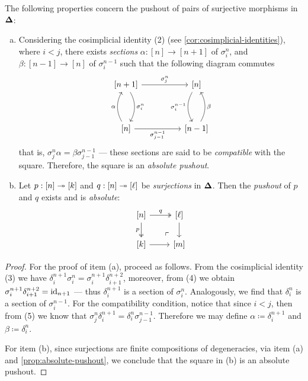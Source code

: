 \begin{lemma}
\label{lem:splx-cat-pushout-surjections}
The following properties concern the pushout of pairs of surjective morphisms in
\({\mathbf{\Delta}}\):
\begin{enumerate}[(a)]\setlength\itemsep{0em}
\item Considering the cosimplicial identity (2) (see
  \cref{cor:cosimplicial-identities}), where \(i < j\), there exists
  \emph{sections} \(\alpha: [n] \to [n+1]\) of \(\sigma_i^n\), and
  \(\beta: [n-1] \to [n]\) of \(\sigma_i^{n-1}\) such that the following diagram
  commutes
  \[
  \begin{tikzcd}
  {[n+1]} \ar[rr, "\sigma_j^n"] \ar[dd, bend left, "\sigma_i^n"]
  &&{[n]} \ar[dd, bend right, "\sigma_i^{n-1}"'] \\ & &\\
  {[n]} \ar[uu, bend left, "\alpha"] \ar[rr, "\sigma_{j-1}^{n-1}"']
  &&{[n-1]} \ar[uu, bend right, "\beta"']
  \end{tikzcd}
  \]
  that is, \(\sigma_j^n \alpha = \beta \sigma_{j-1}^{n-1}\) --- these sections
  are said to be \emph{compatible} with the square. Therefore, the square is an
  \emph{absolute pushout}.
\item Let \(p: [n] \twoheadrightarrow [k]\) and \(q: [n] \twoheadrightarrow [\ell]\) be \emph{surjections}
  in \({\mathbf{\Delta}}\). Then the \emph{pushout} of \(p\) and \(q\) exists and is
  \emph{absolute}:
  \[
  \begin{tikzcd}
  {[n]} \ar[r, two heads, "q"]
  \ar[d, two heads, "p"']
  \ar[rd, very near end, phantom, "\ulcorner"]
  &{[\ell]} \ar[d] \\
  {[k]} \ar[r] &{[m]}
  \end{tikzcd}
  \]
\end{enumerate}
\end{lemma}

\begin{proof}
For the proof of item (a), proceed as follows. From the cosimplicial identity
(3) we have \(\delta_i^{n+1} \sigma_i^n = \sigma_i^{n+1} \delta_{i+1}^{n+2}\),
moreover, from (4) we obtain \(\sigma_i^{n+1} \delta_{i+1}^{n+2} = \operatorname{id}_{n+1}\)
--- thus \(\delta_i^{n+1}\) is a section of \(\sigma_i^n\). Analogously, we find
that \(\delta_i^n\) is a section of \(\sigma_i^{n-1}\). For the
compatibility condition, notice that since \(i < j\), then from (5) we know that
\(\sigma_j^n \delta_i^{n+1} = \delta_i^n \sigma_{j-1}^{n-1}\). Therefore we may
define \(\alpha \coloneq \delta_i^{n+1}\) and \(\beta \coloneq \delta_i^n\).

For item (b), since surjections are finite compositions of degeneracies, via
item (a) and \cref{prop:absolute-pushout}, we conclude that the square in (b) is
an absolute pushout.
\end{proof}

